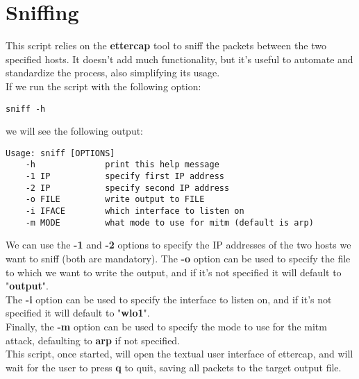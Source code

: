 \section{Sniffing}
This script relies on the \textbf{ettercap} tool to sniff the packets between the two specified
hosts. It doesn't add much functionality, but it's useful to automate
and standardize the process, also simplifying its usage.\\
If we run the script with the following option:
\begin{lstlisting}[numbers=none]
    sniff -h
\end{lstlisting}
we will see the following output:
\begin{lstlisting}[numbers=none]
    Usage: sniff [OPTIONS]
    -h              print this help message
    -1 IP           specify first IP address
    -2 IP           specify second IP address
    -o FILE         write output to FILE
    -i IFACE        which interface to listen on
    -m MODE         what mode to use for mitm (default is arp)
\end{lstlisting}
We can use the \textbf{-1} and \textbf{-2} options to specify the IP addresses of the
two hosts we want to sniff (both are mandatory). The \textbf{-o} option can be used
to specify the file to which we want to write the output, and if it's not specified
it will default to "\textbf{output}".\\
The \textbf{-i} option can be used to specify the interface to listen on, and if it's
not specified it will default to "\textbf{wlo1}".\\
Finally, the \textbf{-m} option can be used to specify the mode to use for the mitm
attack, defaulting to \textbf{arp} if not specified.\\
This script, once started, will open the textual user interface of ettercap,
and will wait for the user to press \textbf{q} to quit, saving all packets
to the target output file.\\
\newpage